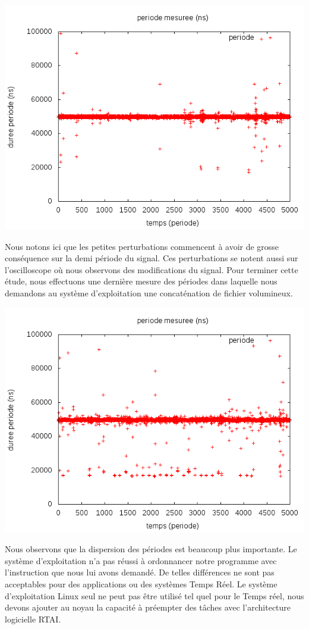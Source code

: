 \begin{center}
\includegraphics[width = \textwidth]{./I/images/delta1.png}
\end{center}
Nous notons ici que les petites perturbations commencent à avoir de grosse conséquence sur la demi période du signal. Ces perturbations se notent aussi sur l'oscilloscope où nous observons des modifications du signal. Pour terminer cette étude, nous effectuons une dernière mesure des périodes dans laquelle nous demandons au système d'exploitation une concaténation de fichier volumineux. 


\begin{center}
\includegraphics[width = \textwidth]{./I/images/delta_cat.png}
\end{center}

Nous observons que la dispersion des périodes est beaucoup plus importante. Le système d'exploitation n'a pas réussi à ordonnancer notre programme avec l'instruction que nous lui avons demandé. De telles différences ne sont pas acceptables pour des applications ou des systèmes Temps Réel. Le système d'exploitation Linux seul ne peut pas être utilisé tel quel pour le Temps réel, nous devons ajouter au noyau la capacité à préempter des tâches avec l'architecture logicielle RTAI.